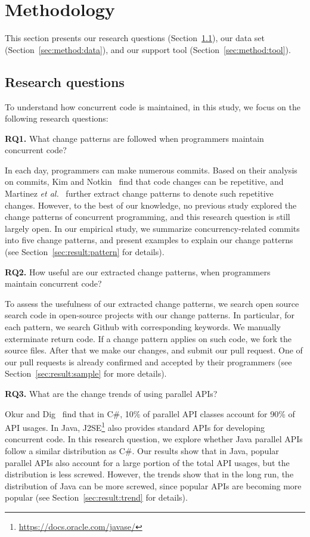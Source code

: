 \section{Methodology}
\label{sec:method}
This section presents our research questions (Section~\ref{sec:method:rq}), our data set (Section~\ref{sec:method:data}), and our support tool (Section~\ref{sec:method:tool}).
\subsection{Research questions}
\label{sec:method:rq}
To understand how concurrent code is maintained, in this study, we focus on the following research questions:

\textbf{RQ1.} What change patterns are followed when programmers maintain concurrent code?

In each day, programmers can make numerous commits. Based on their analysis on commits, Kim and Notkin~\cite{conf/icse/KimN09} find that code changes can be repetitive, and Martinez \emph{et al.}~\cite{conf/icsm/MartinezDM13} further extract change patterns to denote such repetitive changes. However, to the best of our knowledge, no previous study explored the change patterns of concurrent programming, and this research question is still largely open. In our empirical study, we summarize concurrency-related commits into five change patterns, and present examples to explain our change patterns (see Section~\ref{sec:result:pattern} for details).

\textbf{RQ2.} How useful are our extracted change patterns, when programmers maintain concurrent code?

To assess the usefulness of our extracted change patterns, we search open source search code in open-source projects with our change patterns. In particular, for each pattern, we search Github with corresponding keywords. We manually exterminate return code. If a change pattern applies on such code, we fork the source files. After that we make our changes, and submit our pull request. One of our pull requests is already confirmed and accepted by their programmers (see Section~\ref{sec:result:sample} for more details).

\textbf{RQ3.} What are the change trends of using parallel APIs?

Okur and Dig~\cite{conf/sigsoft/OkurD12} find that in C\#, 10\% of parallel API classes account for 90\% of API usages. In Java, J2SE\footnote{\url{https://docs.oracle.com/javase/}} also provides standard APIs for developing concurrent code. In this research question, we explore whether Java parallel APIs follow a similar distribution as C\#. Our results show that in Java, popular parallel APIs also account for a large portion of the total API usages, but the distribution is less screwed. However, the trends show that in the long run, the distribution of Java can be more screwed, since popular APIs are becoming more popular (see Section~\ref{sec:result:trend} for details). 

